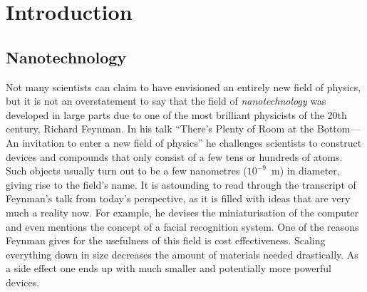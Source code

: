 
\chapter{Introduction}
\label{sec:introduction}

%
\section{Nanotechnology}
\label{sec:nanotechnology}

Not many scientists can claim to have envisioned an entirely new field of
physics, but it is not an overstatement to say that the field of
\emph{nanotechnology} was developed in large parts due to one of the most
brilliant physicists of the 20th century, Richard Feynman. In his talk ``There's
Plenty of Room at the Bottom---An invitation to enter a new field of
physics''\autocite{Feynman_TherePlentyRoom_1960} he challenges scientists to
construct devices and compounds that only consist of a few tens or hundreds of
atoms. Such objects usually turn out to be a few nanometres ($10^{-9}$~m) in
diameter, giving rise to the field's name. It is astounding to read through the
transcript of Feynman's talk from today's perspective, as it is filled with
ideas that are very much a reality now. For example, he devises the
miniaturisation of the computer and even mentions the concept of a facial
recognition system. One of the reasons Feynman gives for the usefulness of this
field is cost effectiveness. Scaling everything down in size decreases the
amount of materials needed drastically. As a side effect one ends up with much
smaller and potentially more powerful devices.

